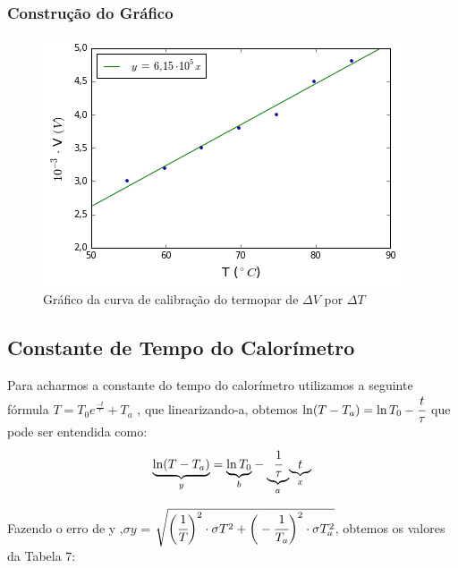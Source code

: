 \documentclass[a4paper]{article}
\begin{document}
			\subsubsection{Construção do Gráfico}

			\begin{figure}[!ht]
					\begin{centering}
						\includegraphics[scale=0.745]{exp06a-parte1.png}
					\par\end{centering}
				\caption{Gráfico da curva de calibração do termopar de $\Delta V$ por $\Delta T$}
			\end{figure}

	\subsection{Constante de Tempo do Calorímetro}
	Para acharmos a constante do tempo do calorímetro utilizamos a seguinte fórmula $ T = T_{0}e^{\frac{-t}{\tau}} + T_{a} $ , que linearizando-a, obtemos $ \ln (T - T_a) = \ln T_0 - \cfrac{t}{\tau}$ que pode ser entendida como:
	\begin{equation}
		\underset{y}{\underbrace{\ln (T - T_a)}} = \underset{b}{\underbrace{\ln T_0}} - \underset{a}{\underbrace{\cfrac{1}{\tau}}} \underset{x}{\underbrace{t}}
	\end{equation}
	
	Fazendo o erro de y ,$\sigma y$ = $\sqrt{\bigg(\cfrac{1}{T}\bigg)^2 \cdot \sigma T^2 + \bigg(- \cfrac{1}{T_a}\bigg)^2 \cdot \sigma T_a^2}$, obtemos os valores da Tabela 7:
	
\end{document}
